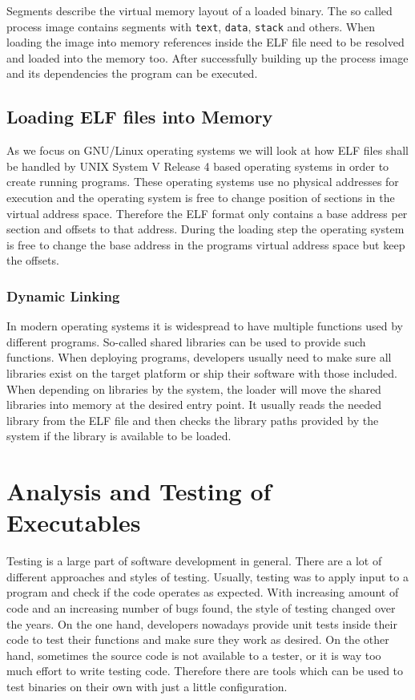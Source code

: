 Segments describe the virtual memory layout of a loaded binary. The so called 
process image contains segments with \texttt{text}, \texttt{data}, 
\texttt{stack} and others. When loading the image into memory references inside 
the ELF file need to be resolved and loaded into the memory too. After 
successfully building up the process image and its dependencies the program can 
be executed.

\subsection{Loading ELF files into Memory}

As we focus on GNU/Linux operating systems we will look at how ELF files shall 
be handled by UNIX System V Release 4 based operating systems in order to 
create running programs.
These operating systems use no physical addresses for execution and the 
operating system is free to change position of sections in the virtual address 
space. Therefore the ELF format only contains a base address per section and 
offsets to that address. During the loading step the operating system is free 
to change the base address in the programs virtual address space but keep the 
offsets.

\subsubsection{Dynamic Linking}

In modern operating systems it is widespread to have multiple functions used by
different programs. So-called shared libraries can be used to provide such
functions. When deploying programs, developers usually need to make sure all
libraries exist on the target platform or ship their software with those
included. When depending on libraries by the system, the loader will move the
shared libraries into memory at the desired entry point. It usually reads the
needed library from the ELF file and then checks the library paths provided by
the system if the library is available to be loaded.

\section{Analysis and Testing of Executables}

Testing is a large part of software development in general. There are a lot of
different approaches and styles of testing. Usually, testing was to apply input
to a program and check if the code operates as expected. With increasing amount
of code and an increasing number of bugs found, the style of testing changed
over the years. On the one hand, developers nowadays provide unit tests inside
their code to test their functions and make sure they work as desired. On the
other hand, sometimes the source code is not available to a tester, or it is way
too much effort to write testing code. Therefore there are tools which can be
used to test binaries on their own with just a little configuration.


